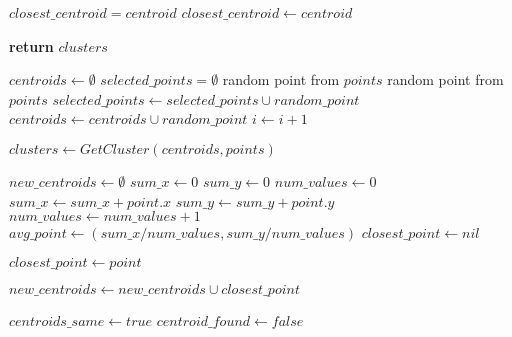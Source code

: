     \begin{algorithm}
    \begin{algorithmic} [1]
        \State $closest\_centroid = centroid$
        \State $closest\_centroid \gets centroid$
      \EndIf
    \EndFor
  \EndFor

  \State \textbf{return} $clusters$
\EndProcedure

    \State $centroids \gets \emptyset$
    \State $selected\_points = \emptyset$
     random point from $points$
       random point from $points$
    \EndWhile
    \State $selected\_points \gets selected\_points \cup random\_point$
    \State $centroids \gets centroids \cup random\_point$
    \State $i \gets i+1$
    \EndFor

      \State $clusters \gets GetCluster(centroids, points)$
    \end{algorithmic}
    \end{algorithm}
    \begin{algorithm}
    \begin{algorithmic} [1]
      \State $new\_centroids \gets \emptyset$
        \State $sum\_x \gets 0$
        \State $sum\_y \gets 0$
        \State $num\_values \gets 0$
          \State $sum\_x \gets sum\_x + point.x$
          \State $sum\_y \gets sum\_y + point.y$
          \State $num\_values \gets num\_values +1$
        \EndFor
        \State $avg\_point \gets (sum\_x/num\_values, sum\_y/num\_values)$
        \State $closest\_point \gets nil$

            \State $closest\_point \gets point$
          \EndIf
        \EndFor

        \State $new\_centroids \gets new\_centroids \cup closest\_point$

      \EndFor

      \State $centroids\_same \gets true$
        \State $centroid\_found \gets false$
    \end{algorithmic}
    \end{algorithm}
